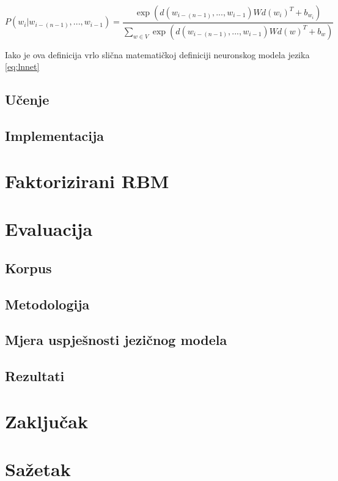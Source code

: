 \documentclass[times, utf8, diplomski, numeric]{fer}
\begin{document}
\begin{equation}
P(w_i | w_{i - (n - 1)}, ... , w_{i - 1}) 
  = \frac{\exp(d(w_{i - (n - 1)}, ... , w_{i - 1}) W d(w_i)^T + b_{w_i})}
  {\sum_{w \in V} \exp(d(w_{i - (n - 1)}, ... , w_{i - 1}) W d(w)^T + b_{w})}
\end{equation}

Iako je ova definicija vrlo slična matematičkoj definiciji neuronskog modela jezika \ref{eq:lnnet}

\section{Učenje}

\section{Implementacija}

\chapter{Faktorizirani RBM}

\chapter{Evaluacija}

\section{Korpus}

\section{Metodologija}

\section{Mjera uspješnosti jezičnog modela}

\section{Rezultati}

\chapter{Zaključak} 




\chapter{Sažetak}
\end{document}
